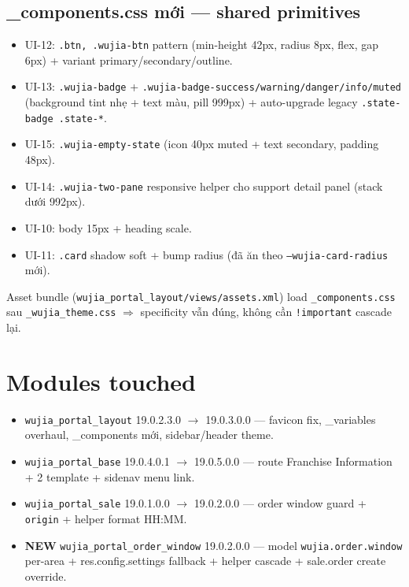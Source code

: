 \subsection{\_components.css mới --- shared primitives}

\begin{itemize}[leftmargin=*]
    \item UI-12: \texttt{.btn, .wujia-btn} pattern (min-height 42px, radius 8px, flex, gap 6px) + variant primary/secondary/outline.
    \item UI-13: \texttt{.wujia-badge} + \texttt{.wujia-badge-success/warning/danger/info/muted} (background tint nhẹ + text màu, pill 999px) + auto-upgrade legacy \texttt{.state-badge .state-*}.
    \item UI-15: \texttt{.wujia-empty-state} (icon 40px muted + text secondary, padding 48px).
    \item UI-14: \texttt{.wujia-two-pane} responsive helper cho support detail panel (stack dưới 992px).
    \item UI-10: body 15px + heading scale.
    \item UI-11: \texttt{.card} shadow soft + bump radius (đã ăn theo \texttt{--wujia-card-radius} mới).
\end{itemize}

Asset bundle (\texttt{wujia\_portal\_layout/views/assets.xml}) load
\texttt{\_components.css} sau \texttt{\_wujia\_theme.css} \(\Rightarrow\)
specificity vẫn đúng, không cần \texttt{!important} cascade lại.

\section{Modules touched}

\begin{itemize}[leftmargin=*]
    \item \texttt{wujia\_portal\_layout} 19.0.2.3.0 \(\to\) 19.0.3.0.0 --- favicon fix, \_variables overhaul, \_components mới, sidebar/header theme.
    \item \texttt{wujia\_portal\_base} 19.0.4.0.1 \(\to\) 19.0.5.0.0 --- route Franchise Information + 2 template + sidenav menu link.
    \item \texttt{wujia\_portal\_sale} 19.0.1.0.0 \(\to\) 19.0.2.0.0 --- order window guard + \texttt{origin} + helper format HH:MM.
    \item \textbf{NEW} \texttt{wujia\_portal\_order\_window} 19.0.2.0.0 --- model \texttt{wujia.order.window} per-area + res.config.settings fallback + helper cascade + sale.order create override.
\end{itemize}

